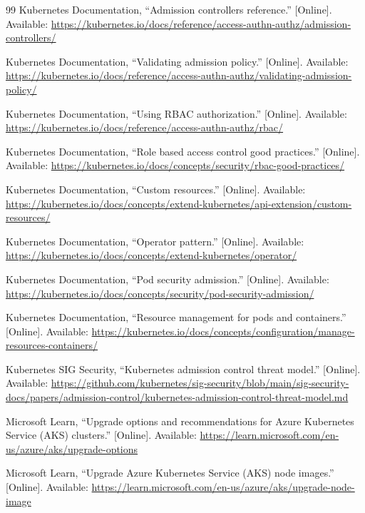 \documentclass[10pt,journal]{IEEEtran}
\begin{document}
\begin{thebibliography}{99}
Kubernetes Documentation, ``Admission controllers reference.'' [Online]. Available: \url{https://kubernetes.io/docs/reference/access-authn-authz/admission-controllers/}

Kubernetes Documentation, ``Validating admission policy.'' [Online]. Available: \url{https://kubernetes.io/docs/reference/access-authn-authz/validating-admission-policy/}

Kubernetes Documentation, ``Using RBAC authorization.'' [Online]. Available: \url{https://kubernetes.io/docs/reference/access-authn-authz/rbac/}

Kubernetes Documentation, ``Role based access control good practices.'' [Online]. Available: \url{https://kubernetes.io/docs/concepts/security/rbac-good-practices/}

Kubernetes Documentation, ``Custom resources.'' [Online]. Available: \url{https://kubernetes.io/docs/concepts/extend-kubernetes/api-extension/custom-resources/}

Kubernetes Documentation, ``Operator pattern.'' [Online]. Available: \url{https://kubernetes.io/docs/concepts/extend-kubernetes/operator/}

Kubernetes Documentation, ``Pod security admission.'' [Online]. Available: \url{https://kubernetes.io/docs/concepts/security/pod-security-admission/}

Kubernetes Documentation, ``Resource management for pods and containers.'' [Online]. Available: \url{https://kubernetes.io/docs/concepts/configuration/manage-resources-containers/}

Kubernetes SIG Security, ``Kubernetes admission control threat model.'' [Online]. Available: \url{https://github.com/kubernetes/sig-security/blob/main/sig-security-docs/papers/admission-control/kubernetes-admission-control-threat-model.md}

Microsoft Learn, ``Upgrade options and recommendations for Azure Kubernetes Service (AKS) clusters.'' [Online]. Available: \url{https://learn.microsoft.com/en-us/azure/aks/upgrade-options}

Microsoft Learn, ``Upgrade Azure Kubernetes Service (AKS) node images.'' [Online]. Available: \url{https://learn.microsoft.com/en-us/azure/aks/upgrade-node-image}


\end{thebibliography}
\end{document}
